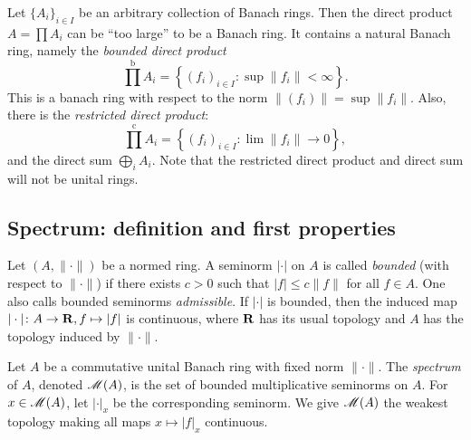 \begin{example}
Let $\{A_i\}_{i\in I}$ be an arbitrary collection of Banach rings. Then the 
direct product $A=\prod A_i$ can be ``too large'' to be a Banach ring. It 
contains a natural Banach ring, namely the \emph{bounded direct product} 
\[
  \prod^\mathrm{b} A_i = \left\{(f_i)_{i\in I}\colon \sup\|f_i\|<\infty\right\} .
\]
This is a banach ring with respect to the norm 
$\|(f_i)\| = \sup \|f_i\|$. Also, there is the \emph{restricted direct 
product}:
\[
  \prod^\mathrm{c} A_i = \left\{(f_i)_{i\in I}\colon \lim \|f_i\|\to 0\right\} ,
\]
and the direct sum $\bigoplus_i A_i$. Note that the restricted direct product 
and direct sum will not be unital rings. 
\end{example}





\subsection{Spectrum: definition and first properties}

Let $(A,\|\cdot\|)$ be a normed ring. A seminorm $|\cdot|$ on $A$ is called 
\emph{bounded} (with respect to $\|\cdot\|$) if there exists $c>0$ such that 
$|f|\leqslant c\|f\|$ for all $f\in A$. One also calls bounded seminorms 
\emph{admissible}. If $|\cdot|$ is bounded, then the induced map 
$|\cdot|\colon A\to \mathbf{R},f\mapsto |f|$ is continuous, where $\mathbf{R}$ has its usual 
topology and $A$ has the topology induced by $\|\cdot\|$. 

\begin{definition}
Let $A$ be a commutative unital Banach ring with fixed norm $\|\cdot\|$. The 
\emph{spectrum} of $A$, denoted $\operatorname{\mathscr{M}}(A)$, is the set of bounded 
multiplicative seminorms on $A$. For $x\in \operatorname{\mathscr{M}}(A)$, let $|\cdot|_x$ be 
the corresponding seminorm. We give $\operatorname{\mathscr{M}}(A)$ the weakest topology making 
all maps $x\mapsto |f|_x$ continuous. 
\end{definition}

